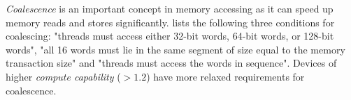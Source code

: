 \textit{Coalescence} is an important concept in memory accessing as it can speed up memory reads and stores significantly. \cite{cuda} lists the following three conditions for coalescing: "threads must access either 32-bit words, 64-bit words, or 128-bit words", "all 16 words must lie in the same segment of size equal to the memory transaction size" and "threads must access the words in sequence". Devices of higher \textit{compute capability} ($> 1.2$) have more relaxed requirements for coalescence.